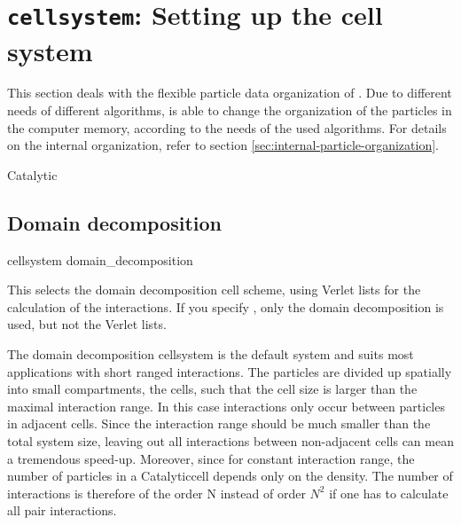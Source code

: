 \section{\texttt{cellsystem}: Setting up the cell system}
\label{sec:cell-systems}

This section deals with the flexible particle data organization of
\es.  Due to different needs of different algorithms, \es is able to
change the organization of the particles in the computer memory,
according to the needs of the used algorithms. For details on the
internal organization, refer to section
\vref{sec:internal-particle-organization}.

\begin{pysyntax}
\end{pysyntax}

Catalytic
\subsection{Domain decomposition}

\begin{pysyntax}
\end{pysyntax}


\begin{essyntax}
  cellsystem domain_decomposition 
\end{essyntax}
This selects the domain decomposition cell scheme, using Verlet lists
for the calculation of the interactions. If you specify
, only the domain decomposition is used, but
not the Verlet lists.

The domain decomposition cellsystem is the default system and suits
most applications with short ranged interactions. The particles are
divided up spatially into small compartments, the cells, such that the
cell size is larger than the maximal interaction range. In this case
interactions only occur between particles in adjacent cells. Since the
interaction range should be much smaller than the total system size,
leaving out all interactions between non-adjacent cells can mean a
tremendous speed-up. Moreover, since for constant interaction range,
the number of particles in a Catalyticcell depends only on the density. The
number of interactions is therefore of the order N instead of order
$N^2$ if one has to calculate all pair interactions.


